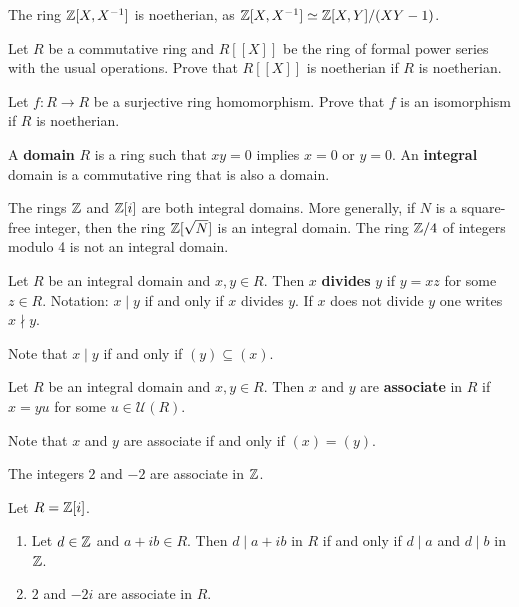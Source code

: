\begin{example}
	The ring $\mathbb{Z}[X,X^{-1}]$ is noetherian, as $\mathbb{Z}[X,X^{-1}]\simeq\mathbb{Z}[X,Y]/(XY-1)$. 
\end{example}
 

\begin{exercise}
    Let $R$ be a commutative ring and $R[\![X]\!]$ be the ring of formal power series with the usual operations.  
	Prove that $R[\![X]\!]$ is noetherian if $R$ is noetherian. 	
\end{exercise}

\begin{exercise}
	Let $f\colon R\to R$ be a surjective ring homomorphism. Prove that $f$ is an isomorphism
	if $R$ is noetherian. 	
\end{exercise}


\begin{definition}
    A \textbf{domain} $R$ is a ring such that $xy=0$ implies $x=0$ or $y=0$. 
    An \textbf{integral} domain is a commutative ring that is also a domain. 
\end{definition}

The rings $\mathbb{Z}$ and $\mathbb{Z}[i]$ are both integral domains. 
More generally, if $N$ is a square-free integer, 
then the ring $\mathbb{Z}[\sqrt{N}]$ is an integral domain.  
The ring $\mathbb{Z}/4$ of 
integers modulo 4 is not an integral domain. 

\begin{definition}
	Let $R$ be an integral domain and $x,y\in R$. Then $x$ \textbf{divides} $y$ 
	if $y=xz$ for some $z\in R$. 
	Notation: $x\mid y$ if and only if $x$ divides $y$. If $x$ does not
	divide $y$ one writes $x\nmid y$.  
\end{definition}

Note that $x\mid y$ if and only if $(y)\subseteq (x)$.
	
\begin{definition}
	Let $R$ be an integral domain and $x,y\in R$. Then $x$ and $y$ are
	\textbf{associate} in $R$ if $x=yu$ for some $u\in\mathcal{U}(R)$. 
\end{definition}

Note that $x$ and $y$ are associate if and only if $(x)=(y)$.

\begin{example}
	The integers $2$ and $-2$ are associate in $\mathbb{Z}$.	
\end{example}

\begin{example}
	Let $R=\mathbb{Z}[i]$. 
	\begin{enumerate}
		\item Let $d\in\mathbb{Z}$ and $a+ib\in R$. Then $d\mid a+ib$ in $R$ if and only if 
			$d\mid a$ and $d\mid b$ in $\mathbb{Z}$. 
		\item $2$ and $-2i$ are associate in $R$.
	\end{enumerate} 	
\end{example}

